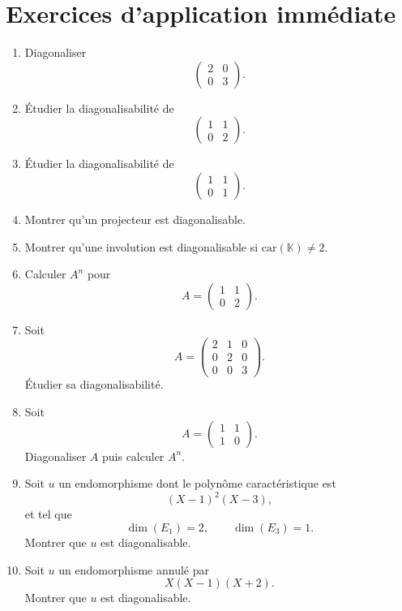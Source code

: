 \documentclass[11pt,a4paper]{article}
\theoremstyle{remark}
\newcommand{\K}{\mathbb{K}}
\begin{document}
\section*{Exercices d’application immédiate}

\begin{enumerate}[label=\textbf{Exercice \arabic*.}]
    \item Diagonaliser
    \[
    \begin{pmatrix}
    2 & 0\\
    0 & 3
    \end{pmatrix}.
    \]

    \item Étudier la diagonalisabilité de
    \[
    \begin{pmatrix}
    1 & 1\\
    0 & 2
    \end{pmatrix}.
    \]

    \item Étudier la diagonalisabilité de
    \[
    \begin{pmatrix}
    1 & 1\\
    0 & 1
    \end{pmatrix}.
    \]

    \item Montrer qu’un projecteur est diagonalisable.

    \item Montrer qu’une involution est diagonalisable si \(\mathrm{car}(\K)\neq 2\).

    \item Calculer \(A^n\) pour
    \[
    A=
    \begin{pmatrix}
    1 & 1\\
    0 & 2
    \end{pmatrix}.
    \]

    \item Soit
    \[
    A=
    \begin{pmatrix}
    2 & 1 & 0\\
    0 & 2 & 0\\
    0 & 0 & 3
    \end{pmatrix}.
    \]
    Étudier sa diagonalisabilité.

    \item Soit
    \[
    A=
    \begin{pmatrix}
    1 & 1\\
    1 & 0
    \end{pmatrix}.
    \]
    Diagonaliser \(A\) puis calculer \(A^n\).

    \item Soit \(u\) un endomorphisme dont le polynôme caractéristique est
    \[
    (X-1)^2(X-3),
    \]
    et tel que
    \[
    \dim(E_1)=2,\qquad \dim(E_3)=1.
    \]
    Montrer que \(u\) est diagonalisable.

    \item Soit \(u\) un endomorphisme annulé par
    \[
    X(X-1)(X+2).
    \]
    Montrer que \(u\) est diagonalisable.
\end{enumerate}
\end{document}
